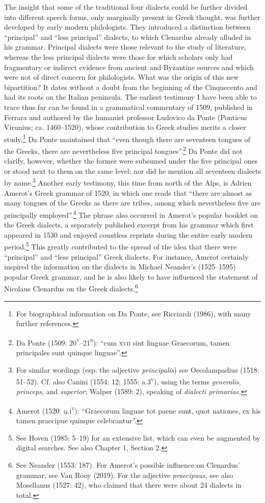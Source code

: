 \begin{styleStandard}
The insight that some of the traditional four dialects could be further divided into different speech forms, only marginally present in Greek thought, was further developed by early modern philologists. They introduced a distinction between “principal” and “less principal” dialects, to which Clenardus already alluded in his grammar. Principal dialects were those relevant to the study of literature, whereas the less principal dialects were those for which scholars only had fragmentary or indirect evidence from ancient and Byzantine sources and which were not of direct concern for philologists. What was the origin of this new bipartition? It dates without a doubt from the beginning of the Cinquecento and had its roots on the Italian peninsula. The earliest testimony I have been able to trace thus far can be found in a grammatical commentary of 1509, published in Ferrara and authored by the humanist professor Ludovico da Ponte (Ponticus Virunius; ca. 1460–1520), whose contribution to Greek studies merits a closer study.\footnote{ For biographical information on Da Ponte, see Ricciardi (1986), with many further references.} Da Ponte maintained that “even though there are seventeen tongues of the Greeks, there are nevertheless five principal tongues”.\footnote{ Da Ponte (1509: 20\textsc{\textsuperscript{v}}–21\textsc{\textsuperscript{r}}): “cum \textsc{xvii} sint linguae Graecorum, tamen principales sunt quinque linguae”.} Da Ponte did not clarify, however, whether the former were subsumed under the five principal ones or stood next to them on the same level; nor did he mention all seventeen dialects by name.\footnote{ For similar wordings (esp. the adjective \textit{principalis}) see Oecolampadius (1518: 51–52). Cf. also Canini (1554: 12; 1555: a.3\textsc{\textsuperscript{v}}), using the terms \textit{generalis}, \textit{princeps}, and \textit{superior}; Walper (1589: 2), speaking of \textit{dialecti primariae}.} Another early testimony, this time from north of the Alps, is Adrien Amerot’s Greek grammar of 1520, in which one reads that “there are almost as many tongues of the Greeks as there are tribes, among which nevertheless five are principally employed”.\footnote{ Amerot (1520: \textsc{q}.i\textsc{\textsuperscript{v}}\textsc{)}: “Graecorum linguae tot paene sunt, quot nationes, ex his tamen praecipue quinque celebrantur”.} The phrase also occurred in Amerot’s popular booklet on the Greek dialects, a separately published excerpt from his grammar which first appeared in 1530 and enjoyed countless reprints during the entire early modern period.\footnote{ See Hoven (1985: 5–19) for an extensive list, which can even be augmented by digital searches. See also Chapter 1, Section 2.} This greatly contributed to the spread of the idea that there were “principal” and “less principal” Greek dialects. For instance, Amerot certainly inspired the information on the dialects in Michael Neander’s (1525–1595) popular Greek grammar, and he is also likely to have influenced the statement of Nicolaus Clenardus on the Greek dialects.\footnote{ See Neander (1553: 187). For Amerot’s possible influence on Clenardus’ grammar, see Van Rooy (2019). For the adjective \textit{praecipuus}, see also Mosellanus (1527: 42), who claimed that there were about 24 dialects in total.}

\end{styleStandard}
